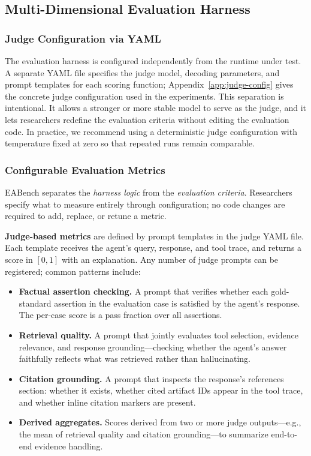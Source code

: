 \subsection{Multi-Dimensional Evaluation Harness}
\label{sec:method_evalharness}

\subsubsection{Judge Configuration via YAML}

The evaluation harness is configured independently from the runtime under test. A separate YAML file specifies the judge model, decoding parameters, and prompt templates for each scoring function; Appendix~\ref{app:judge-config} gives the concrete judge configuration used in the experiments. This separation is intentional. It allows a stronger or more stable model to serve as the judge, and it lets researchers redefine the evaluation criteria without editing the evaluation code. In practice, we recommend using a deterministic judge configuration with temperature fixed at zero so that repeated runs remain comparable.

\subsubsection{Configurable Evaluation Metrics}

EABench separates the \emph{harness logic} from the \emph{evaluation criteria}. Researchers specify what to measure entirely through configuration; no code changes are required to add, replace, or retune a metric.

\textbf{Judge-based metrics} are defined by prompt templates in the judge YAML file. Each template receives the agent's query, response, and tool trace, and returns a score in $[0,1]$ with an explanation. Any number of judge prompts can be registered; common patterns include:
\begin{itemize}[leftmargin=*,itemsep=2pt,topsep=4pt]
  \item \textbf{Factual assertion checking.} A prompt that verifies whether each gold-standard assertion in the evaluation case is satisfied by the agent's response. The per-case score is a pass fraction over all assertions.
  \item \textbf{Retrieval quality.} A prompt that jointly evaluates tool selection, evidence relevance, and response grounding---checking whether the agent's answer faithfully reflects what was retrieved rather than hallucinating.
  \item \textbf{Citation grounding.} A prompt that inspects the response's references section: whether it exists, whether cited artifact IDs appear in the tool trace, and whether inline citation markers are present.
  \item \textbf{Derived aggregates.} Scores derived from two or more judge outputs---e.g., the mean of retrieval quality and citation grounding---to summarize end-to-end evidence handling.
\end{itemize}

